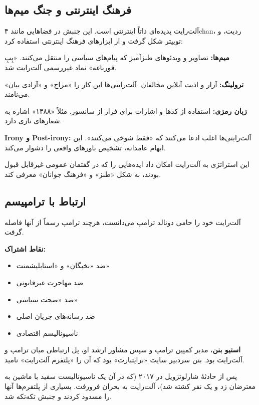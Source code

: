 \subsection{فرهنگ اینترنتی و جنگ میم‌ها}


آلت‌رایت پدیده‌ای ذاتاً اینترنتی است. این جنبش در فضاهایی مانند ۴chan، ردیت، و توییتر شکل گرفت و از ابزارهای فرهنگ اینترنتی استفاده کرد:

\textbf{میم‌ها:} تصاویر و ویدئوهای طنزآمیز که پیام‌های سیاسی را منتقل می‌کنند. «پِپِ قورباغه» نماد غیررسمی آلت‌رایت شد.

\textbf{ترولینگ:} آزار و اذیت آنلاین مخالفان. آلت‌رایتی‌ها این کار را «مزاح» و «آزادی بیان» می‌نامند.

\textbf{زبان رمزی:} استفاده از کدها و اشارات برای فرار از سانسور. مثلاً «۱۴۸۸» اشاره به شعارهای نازی دارد.

\textbf{Irony و Post-irony:} آلت‌رایتی‌ها اغلب ادعا می‌کنند که «فقط شوخی می‌کنند». این ابهام عامدانه، تشخیص باورهای واقعی را دشوار می‌کند.

این استراتژی به آلت‌رایت امکان داد ایده‌هایی را که در گفتمان عمومی غیرقابل قبول بودند، به شکل «طنز» و «فرهنگ جوانان» معرفی کند.


\subsection{ارتباط با ترامپیسم}


آلت‌رایت خود را حامی دونالد ترامپ می‌دانست، هرچند ترامپ رسماً از آنها فاصله گرفت.

\textbf{نقاط اشتراک:}
\begin{itemize}
    \item ضد «نخبگان» و «استابلیشمنت»
    \item ضد مهاجرت غیرقانونی
    \item ضد «صحت سیاسی»
    \item ضد رسانه‌های جریان اصلی
    \item ناسیونالیسم اقتصادی
\end{itemize}

\textbf{استیو بنن}، مدیر کمپین ترامپ و سپس مشاور ارشد او، پل ارتباطی میان ترامپ و آلت‌رایت بود. بنن سردبیر سایت «برایتبارت» بود که آن را «پلتفرم آلت‌رایت» نامید.

پس از حادثهٔ شارلوتزویل در ۲۰۱۷ (که در آن یک ناسیونالیست سفید با ماشین به معترضان زد و یک نفر کشته شد)، آلت‌رایت به بحران فرورفت. بسیاری از پلتفرم‌ها آنها را مسدود کردند و جنبش تکه‌تکه شد.


